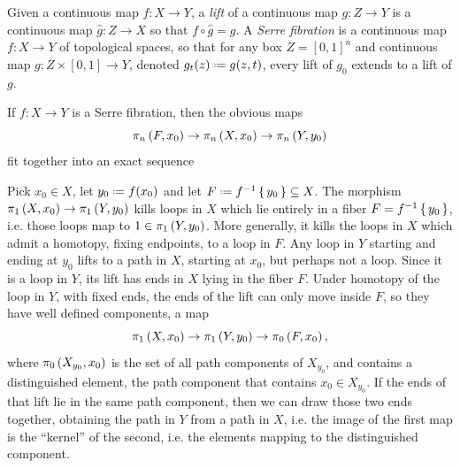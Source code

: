 Given a continuous map \(f \colon X \to Y\), a \emph{lift} of a continuous map \(g \colon Z \to Y\) is a continuous map \(\hat{g} \colon Z \to X\) so that \(f \circ \hat{g}=g\).
A \emph{Serre fibration} is a continuous map \(f \colon X \to Y\) of topological spaces, so that for any box \(Z=[0,1]^n\) and continuous map \(g \colon Z \times [0,1] \to Y\), denoted \(g_t(z)\defeq g(z,t)\), every lift of \(g_0\) extends to a lift of \(g\).


\begin{theorem}
If \(f \colon X \to Y\) is a Serre fibration, then the obvious maps 
\[
\pi_{n}\left(F,x_0\right)\to\pi_{n}\left(X,x_0\right)\to\pi_{n}\left(Y,y_0\right)
\]
fit together into an exact sequence
\begingroup
\newcommand*{\xA}[1]{\homotopyGroup{#1}{F,x_0}}
\newcommand*{\xB}[1]{\homotopyGroup{#1}{X,x_0}}
\newcommand*{\xC}[1]{\homotopyGroup{#1}{Y,y_0}}
\reverseLongExactSequence{\xA}{\xB}{\xC}
\endgroup
\end{theorem}

Pick \(x_0 \in X\), let \(y_0\defeq f(x_0)\) and let \(F\defeq f^{-1}\set{y_0}\subseteq X\).
The morphism \(\pi_{1}\left(X,x_0\right)\to\pi_{1}\left(Y,y_0\right)\) kills loops in \(X\) which lie entirely in a fiber \(F=f^{-1}\set{y_0}\), i.e. those loops map to \(1\in\pi_{1}\left(Y,y_0\right)\).
More generally, it kills the loops in \(X\) which admit a homotopy, fixing endpoints, to a loop in \(F\).
Any loop in \(Y\) starting and ending at \(y_0\) lifts to a path in \(X\), starting at \(x_0\), but perhaps not a loop.
Since it is a loop in \(Y\), its lift has ends in \(X\) lying in the fiber \(F\).
Under homotopy of the loop in \(Y\), with fixed ends, the ends of the lift can only move inside \(F\), so they have well defined components, a map 
\[
\pi_{1}\left(X,x_0\right)\to\pi_{1}\left(Y,y_0\right)\to\pi_{0}\left(F,x_0\right),
\]
where \(\pi_{0}\left(X_{y_0},x_0\right)\) is the set of all path components of \(X_{y_0}\), and contains a distinguished element, the path component that contains \(x_0 \in X_{y_0}\).
If the ends of that lift lie in the same path component, then we can draw those two ends together, obtaining the path in \(Y\) from a path in \(X\), i.e. the image of the first map is the ``kernel'' of the second, i.e. the elements mapping to the distinguished component.

